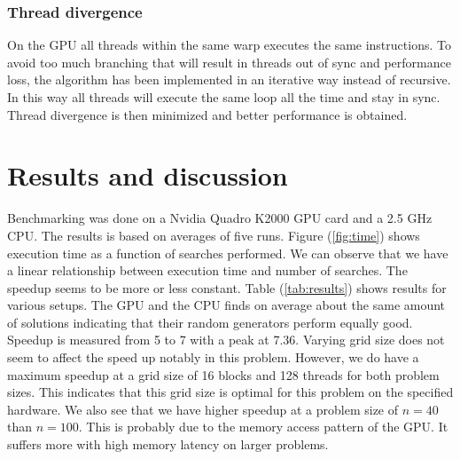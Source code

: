 \documentclass{article}
\begin{document}


\subsubsection{Thread divergence} %
\label{sub:threaddivergence}

On the GPU all threads within the same warp executes the same instructions. To avoid too much branching that will result
in threads out of sync and performance loss, the algorithm has been implemented in an iterative way instead of recursive. In this way all 
threads will execute the same loop all the time and stay in sync. Thread divergence is then minimized and better performance is 
obtained.


\section{Results and discussion}
Benchmarking was done on a Nvidia Quadro K2000 GPU card and a 2.5 GHz CPU. The results is based on
averages of five runs.
Figure (\ref{fig:time}) shows execution time as a function of searches performed. We can observe that we have a linear 
relationship between execution time and number of searches. The speedup seems to be more or less constant. Table (\ref{tab:results}) shows 
results for various setups. The GPU and the CPU finds on average about the same amount of solutions indicating that their
random generators perform equally good. Speedup is measured from 5 to 7 with a peak at 7.36. Varying grid size does not seem
to affect the speed up notably in this problem. However, we do have a maximum speedup at a grid size of 16 blocks and 128 threads for both
problem sizes. This indicates that this grid size is optimal for this problem on the specified hardware.  
We also see that we have higher speedup at a problem size of $n = 40$ than $n = 100$. This is probably due to the 
memory access pattern of the GPU. It suffers more with high memory latency on larger problems. 
\end{document}
